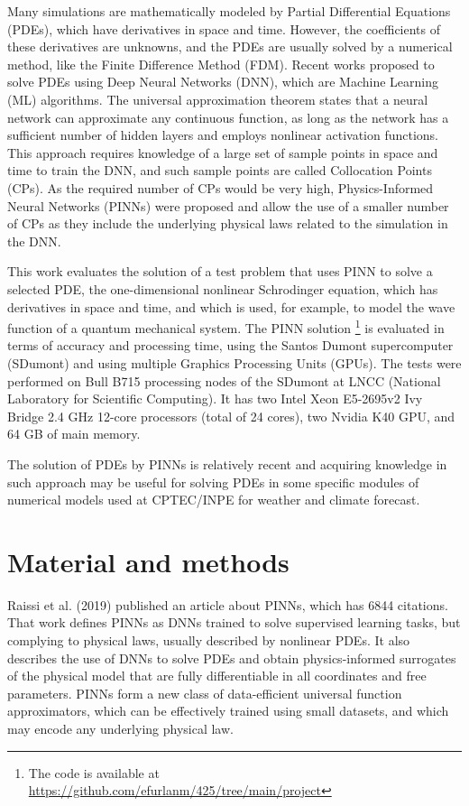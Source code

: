 \documentclass[conference]{IEEEtran}
\begin{document}
\vspace{0.5cm}

Many simulations are mathematically modeled by Partial Differential Equations (PDEs), which have derivatives in space and time. However, the coefficients of these derivatives are unknowns, and the PDEs are usually solved by a numerical method, like the Finite Difference Method (FDM). Recent works proposed to solve PDEs using Deep Neural Networks (DNN), which are Machine Learning (ML) algorithms. The universal approximation theorem states that a neural network can approximate any continuous function, as long as the network has a sufficient number of hidden layers and employs nonlinear activation functions. This approach requires knowledge of a large set of sample points in space and time to train the DNN, and such sample points are called Collocation Points (CPs). As the required number of CPs would be very high, Physics-Informed Neural Networks (PINNs) were proposed and allow the use of a smaller number of CPs as they include the underlying physical laws related to the simulation in the DNN.   

This work evaluates the solution of a test problem that uses PINN to solve a selected PDE, the one-dimensional nonlinear Schrodinger equation, which has derivatives in space and time, and which is used, for example, to model the wave function of a quantum mechanical system. The PINN solution%
\footnote{The code is available at \url{https://github.com/efurlanm/425/tree/main/project}}
is evaluated in terms of accuracy and processing time, using the Santos Dumont supercomputer (SDumont) and using multiple Graphics Processing Units (GPUs). The tests were performed on Bull B715 processing nodes of the SDumont at LNCC (National Laboratory for Scientific Computing). It has two Intel Xeon E5-2695v2 Ivy Bridge 2.4 GHz 12-core processors (total of 24 cores), two Nvidia K40 GPU, and 64 GB of main memory.

The solution of PDEs by PINNs is relatively recent and acquiring knowledge in such approach may be useful for solving PDEs in some specific modules of numerical models used at CPTEC/INPE for weather and climate forecast. 

%
\section{Material and methods}\label{sec:meth}
%
Raissi et al. (2019) \cite{Raissi2019} published an article about PINNs, which has 6844 citations. That work defines PINNs as DNNs trained to solve supervised learning tasks, but complying to physical laws, usually described by nonlinear PDEs. It also describes the use of DNNs to solve PDEs and obtain physics-informed surrogates of the physical model that are fully differentiable in all coordinates and free parameters. PINNs form a new class of data-efficient universal function approximators, which can be effectively trained using small datasets, and which may encode any underlying physical law. 
\end{document}
